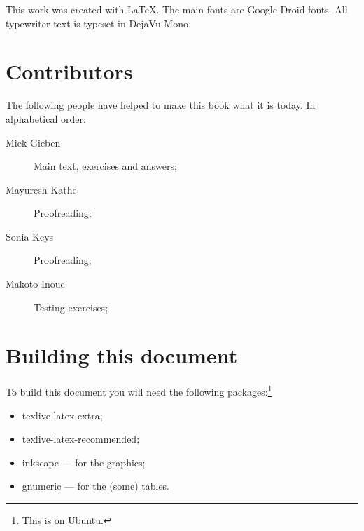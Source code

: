 \noindent{}This work was created with \LaTeX. The main fonts are Google Droid
fonts. All typewriter text is typeset in DejaVu Mono.

\section{Contributors}
The following people have helped to make this book what it is today.
In alphabetical order:
\begin{description}
\item[Miek Gieben] 
{Main text, exercises and answers;}
\item[Mayuresh Kathe]
{Proofreading;}
\item[Sonia Keys]
{Proofreading;}
\item[Makoto Inoue]
{Testing exercises;}
\end{description}

\section{Building this document}
To build this document you will need the following packages:\footnote{This
is on Ubuntu.}
\begin{itemize}
\item{texlive-latex-extra;}
\item{texlive-latex-recommended;}
\item{inkscape --- for the graphics;}
\item{gnumeric --- for the (some) tables.}
\end{itemize}
